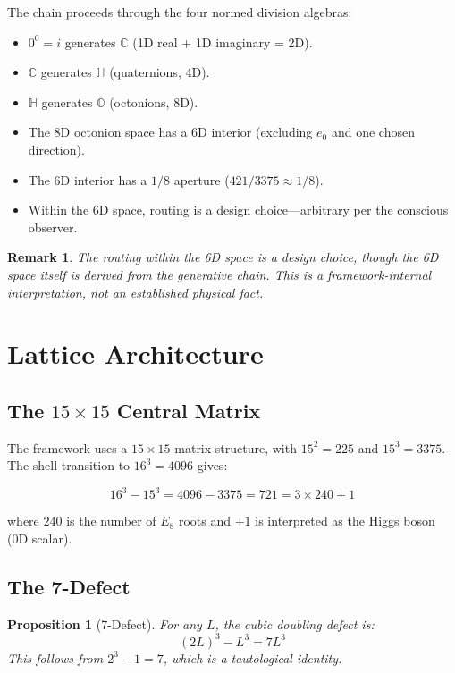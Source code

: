 \documentclass[11pt]{article}
\newtheorem{proposition}{Proposition}
\newtheorem{remark}{Remark}
\begin{document}
The chain proceeds through the four normed division algebras:
\begin{itemize}
\item $0^0 = i$ generates $\mathbb{C}$ (1D real + 1D imaginary = 2D).
\item $\mathbb{C}$ generates $\mathbb{H}$ (quaternions, 4D).
\item $\mathbb{H}$ generates $\mathbb{O}$ (octonions, 8D).
\item The 8D octonion space has a 6D interior (excluding $e_0$ and one chosen direction).
\item The 6D interior has a $1/8$ aperture ($421/3375 \approx 1/8$).
\item Within the 6D space, routing is a design choice---arbitrary per the conscious observer.
\end{itemize}

\begin{remark}
The routing \textit{within} the 6D space is a design choice, though the 6D space itself is derived from the generative chain. This is a framework-internal interpretation, not an established physical fact.
\end{remark}

\section{Lattice Architecture}

\subsection{The $15 \times 15$ Central Matrix}

The framework uses a $15 \times 15$ matrix structure, with $15^2 = 225$ and $15^3 = 3375$. The shell transition to $16^3 = 4096$ gives:

\begin{equation}
16^3 - 15^3 = 4096 - 3375 = 721 = 3 \times 240 + 1
\end{equation}

where $240$ is the number of $E_8$ roots and $+1$ is interpreted as the Higgs boson (0D scalar).

\subsection{The 7-Defect}

\begin{proposition}[7-Defect]
For any $L$, the cubic doubling defect is:
\begin{equation}
(2L)^3 - L^3 = 7L^3
\end{equation}
This follows from $2^3 - 1 = 7$, which is a tautological identity.
\end{proposition}
\end{document}
